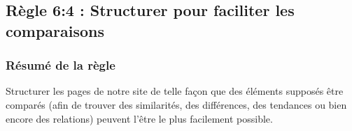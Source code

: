 \documentclass{article}[12pt]
\begin{document}

    \subsection{Règle 6:4 : Structurer pour faciliter les comparaisons}
     \subsubsection*{Résumé de la règle}
     Structurer les pages de notre site de telle façon que des éléments supposés être comparés (afin de trouver des similarités, des différences, des tendances ou bien encore des relations) peuvent l'être le plus facilement possible. 
\end{document}
